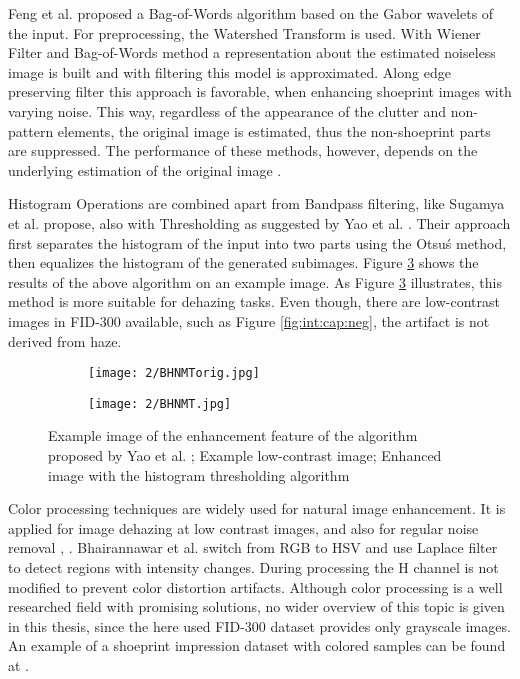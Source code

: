 \documentclass[draft,final]{vutinfth} %
\begin{document}
Feng et al. \cite{feng2011bag} proposed a Bag-of-Words algorithm based on the Gabor wavelets of the input. 
For preprocessing, the Watershed Transform is used.
With Wiener Filter and Bag-of-Words method a representation about the estimated noiseless image is built and with filtering this model is approximated.
Along edge preserving filter this approach is favorable, when enhancing shoeprint images with varying noise.
This way, regardless of the appearance of the clutter and non-pattern elements, the original image is estimated, thus the non-shoeprint parts are suppressed.
The performance of these methods, however, depends on the underlying estimation of the original image \cite{li2014rapid}.
\par
Histogram Operations are combined apart from Bandpass filtering, like Sugamya et al. \cite{sugamya2016image} propose, also with Thresholding as suggested by Yao et al. \cite{yao2016image}. 
Their approach first separates the histogram of the input into two parts using the Otsu\'s method, then equalizes the histogram of the generated subimages. 
Figure \ref{fig:rw:BHNMT} shows the results of the above algorithm on an example image.
As Figure \ref{fig:rw:BHNMT} illustrates, this method is more suitable for dehazing tasks. 
Even though, there are low-contrast images in FID-300 available, such as Figure \ref{fig:int:cap:neg}, the artifact is not derived from haze.

\begin{figure}[h]
  \centering
  \begin{subfigure}[t]{0.4\columnwidth}
    \centering
    \texttt{[image: 2/BHNMTorig.jpg]}
    \subcaption{}
    \label{fig:rw:BHNMTin}
  \end{subfigure}
  \begin{subfigure}[t]{0.4\columnwidth}
    \centering
    \texttt{[image: 2/BHNMT.jpg]}
    \subcaption{}
    \label{fig:rw:BHNMTout}
  \end{subfigure}
  \caption{Example image of the enhancement feature of the algorithm proposed by Yao et al. \cite{yao2016image};
			 Example low-contrast image;  Enhanced image with the histogram thresholding algorithm}
  \label{fig:rw:BHNMT} %
\end{figure}

\par
Color processing techniques are widely used for natural image enhancement.
It is applied for image dehazing at low contrast images, \cite{singh2018dehazing} and also for regular noise removal \cite{ren2018joint}, \cite{zhang2016simultaneous}. 
Bhairannawar et al. \cite{bhairannawar2017color} switch from RGB to HSV and use Laplace filter to detect regions with intensity changes. 
During processing the H channel is not modified to prevent color distortion artifacts.
Although color processing is a well researched field with promising solutions, no wider overview of this topic is given in this thesis, since the here used FID-300 dataset provides only grayscale images. 
An example of a shoeprint impression dataset with colored samples can be found at \cite{katireddy2017novel}. 
\end{document}

